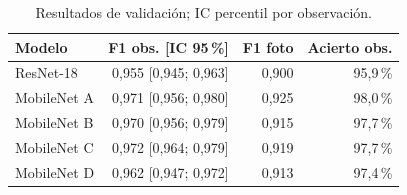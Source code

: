 \begin{table}[H]
\centering
\small
\caption{Resultados de validación; IC percentil por observación.}
\label{tab:results}
\begin{tabularx}{\linewidth}{Y r r r}
\toprule
\textbf{Modelo} & \textbf{F1 obs. [IC 95\,\%]} & \textbf{F1 foto} & \textbf{Acierto obs.}\\
\midrule
ResNet-18 & 0,955 [0,945; 0,963] & 0,900 & 95,9\,\%\\
MobileNet A & 0,971 [0,956; 0,980] & 0,925 & 98,0\,\%\\
MobileNet B & 0,970 [0,956; 0,979] & 0,915 & 97,7\,\%\\
MobileNet C & 0,972 [0,964; 0,979] & 0,919 & 97,7\,\%\\
MobileNet D & 0,962 [0,947; 0,972] & 0,913 & 97,4\,\%\\
\bottomrule
\end{tabularx}
\end{table}
